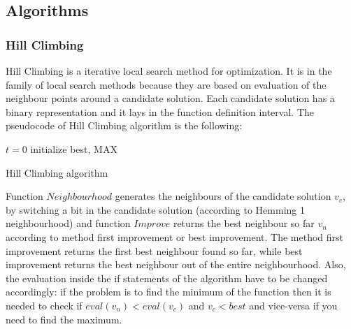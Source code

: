 \documentclass{article}
\begin{document}
\subsection{Algorithms}
\subsubsection{Hill Climbing}
Hill Climbing is a iterative local search method for optimization. It is in the family of local search methods because they are based on evaluation of the neighbour points around a candidate solution. Each candidate solution has a binary representation and it lays in the function definition interval.
The pseudocode of Hill Climbing algorithm is the following:\\
\begin{algorithm}[H]
\SetAlgoLined
 $t = 0$\;
 initialize best, MAX\;
\caption{Hill Climbing algorithm}
\end{algorithm}
Function $Neighbourhood$ generates the neighbours of the candidate solution $v_c$, by switching a bit in the candidate solution (according to Hemming 1 neighbourhood) and function $Improve$ returns the best neighbour so far $v_n$ according to method first improvement  or best improvement. The method first improvement returns the first best neighbour found so far, while best improvement returns the best neighbour out of the entire neighbourhood. Also, the evaluation inside the if statements of the algorithm have to be changed accordingly: if the problem is to find the minimum of the function then it is needed to check if $eval(v_n) < eval(v_c)$ and $v_c < best$ and vice-versa if you need to find the maximum.
\end{document}
